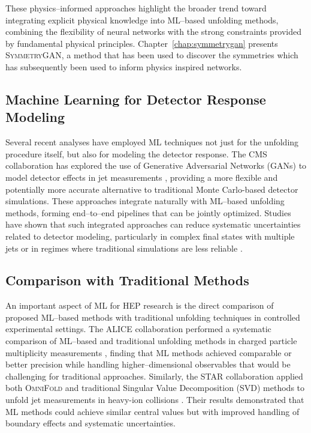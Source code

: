     These physics--informed approaches highlight the broader trend toward integrating explicit physical knowledge into ML--based unfolding methods, combining the flexibility of neural networks with the strong constraints provided by fundamental physical principles.
    Chapter~\ref{chap:symmetrygan} presents \textsc{SymmetryGAN}, a method that has been used to discover the symmetries which has subsequently been used to inform physics inspired networks.
\subsection{Machine Learning for Detector Response Modeling}
    Several recent analyses have employed ML techniques not just for the unfolding procedure itself, but also for modeling the detector response.
    The CMS collaboration has explored the use of Generative Adversarial Networks (GANs) to model detector effects in jet measurements , providing a more flexible and potentially more accurate alternative to traditional Monte Carlo-based detector simulations.
    These approaches integrate naturally with ML--based unfolding methods, forming end--to--end pipelines that can be jointly optimized.
    Studies have shown that such integrated approaches can reduce systematic uncertainties related to detector modeling, particularly in complex final states with multiple jets or in regimes where traditional simulations are less reliable .

\subsection{Comparison with Traditional Methods}
    An important aspect of ML for HEP research is the direct comparison of proposed ML--based methods with traditional unfolding techniques in controlled experimental settings.
    The ALICE collaboration performed a systematic comparison of ML--based and traditional unfolding methods in charged particle multiplicity measurements , finding that ML methods achieved comparable or better precision while handling higher--dimensional observables that would be challenging for traditional approaches.
    Similarly, the STAR collaboration applied both \textsc{OmniFold} and traditional Singular Value Decomposition (SVD) methods to unfold jet measurements in heavy-ion collisions .
    Their results demonstrated that ML methods could achieve similar central values but with improved handling of boundary effects and systematic uncertainties.

